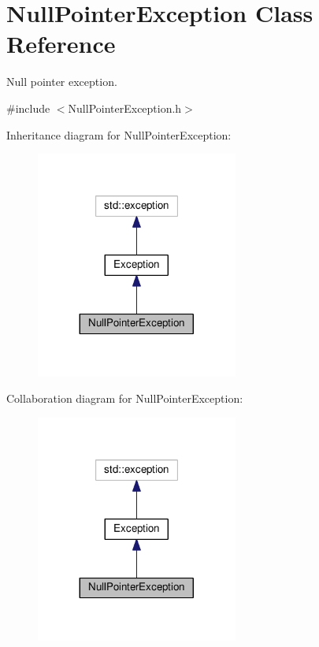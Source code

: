\hypertarget{classNullPointerException}{}\section{Null\+Pointer\+Exception Class Reference}
\label{classNullPointerException}


Null pointer exception.  




{\ttfamily \#include $<$Null\+Pointer\+Exception.\+h$>$}



Inheritance diagram for Null\+Pointer\+Exception\+:\nopagebreak
\begin{figure}[H]
\begin{center}
\leavevmode
\includegraphics[width=188pt]{classNullPointerException__inherit__graph}
\end{center}
\end{figure}


Collaboration diagram for Null\+Pointer\+Exception\+:\nopagebreak
\begin{figure}[H]
\begin{center}
\leavevmode
\includegraphics[width=188pt]{classNullPointerException__coll__graph}
\end{center}
\end{figure}
